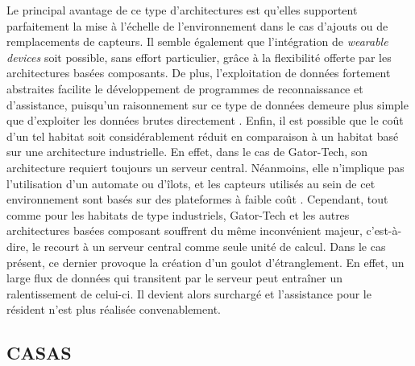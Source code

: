 Le principal avantage de ce type d'architectures est qu'elles supportent parfaitement la mise à l'échelle de l'environnement dans le cas d'ajouts ou de remplacements de capteurs. Il semble également que l'intégration de \textit{wearable devices} soit possible, sans effort particulier, grâce à la flexibilité offerte par les architectures basées composants. De plus, l'exploitation de données fortement abstraites facilite le développement de programmes de reconnaissance et d'assistance, puisqu'un raisonnement sur ce type de données demeure plus simple que d'exploiter les données brutes directement \citep{Helal2005}. Enfin, il est possible que le coût d'un tel habitat soit considérablement réduit en comparaison à un habitat basé sur une architecture industrielle. En effet, dans le cas de Gator-Tech, son architecture requiert toujours un serveur central. Néanmoins, elle n'implique pas l'utilisation d'un automate ou d'îlots, et les capteurs utilisés au sein de cet environnement sont basés sur des plateformes à faible coût \citep{Helal2005}. Cependant, tout comme pour les habitats de type industriels, Gator-Tech et les autres architectures basées composant souffrent du même inconvénient majeur, c'est-à-dire, le recourt à un serveur central comme seule unité de calcul. Dans le cas présent, ce dernier provoque la création d'un goulot d'étranglement. En effet, un large flux de données qui transitent par le serveur peut entraîner un ralentissement de celui-ci. Il devient alors surchargé et l'assistance pour le résident n'est plus réalisée convenablement.

\subsection{CASAS}

